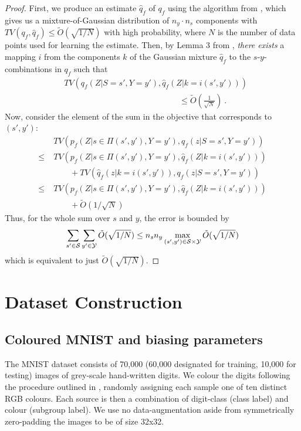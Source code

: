 \begin{proof}
First, we produce an estimate \(\hat{q}_f\) of \(q_f\) using the algorithm from
\cite{ashtiani2020near}, which gives us a mixture-of-Gaussian distribution of \(n_y\cdot n_s\)
components with \(TV(q_f, \hat{q}_f)\leq \tilde{O}(\sqrt{1/N})\) with high probability, where \(N\)
is the number of data points used for learning the estimate. Then, by Lemma 3 from
\cite{SohDunAngGuetal20}, \emph{there exists} a mapping \(i\) from the components \(k\) of the
Gaussian mixture \(\hat{q}_f\) to the \(s\)-\(y\)-combinations in \(q_f\) such that
%
\begin{align}
&TV(q_f(Z|S=s',Y=y'),\hat{q}_f(Z|k=i(s',y'))) \\
&\quad\quad\quad\quad\quad\quad\quad\quad\quad\quad\quad\quad\quad\quad\leq
\tilde{O}\left(\frac{1}{\sqrt{N}}\right)~. \nonumber
\end{align}
%
Now, consider the element of the sum in the objective that corresponds
to \((s',y')\):
%
\begin{align}
&TV(p_f(Z|s\in \Pi(s',y'),Y=y'), q_f(z|S=s',Y=y'))\nonumber\\
\leq \;&TV(p_f(Z|s\in \Pi(s',y'),Y=y'), \hat{q}_f(Z|k=i(s',y')))\nonumber\\
&\quad\quad+TV(\hat{q}_f(z|k=i(s',y')), q_f(z|S=s',Y=y'))\nonumber\\
\leq \;&TV(p_f(Z|s\in \Pi(s',y'),Y=y'), \hat{q}_f(Z|k=i(s',y'))) \nonumber\\
&\quad\quad+\tilde{O}(1/\sqrt{N})
\end{align}
%
Thus, for the whole sum over \(s\) and \(y\), the error is bounded by
\begin{align}
\sum\limits_{s'\in{\mathcal{S}}}\sum\limits_{y^\prime\in{\mathcal{Y}}}\tilde{O}(\sqrt{1/N})
\leq n_sn_y \max\limits_{(s',y')\in{\mathcal{S}}\times{\mathcal{Y}}}\tilde{O}(\sqrt{1/N})
\end{align}
which is equivalent to just \(\tilde{O}(\sqrt{1/N})\).
\end{proof}
%
\section{Dataset Construction}\label{sec:dataset-construction}
%
\subsection{Coloured MNIST and biasing parameters}
%
The MNIST dataset \cite{lecun1998gradient} consists of 70,000 (60,000 designated for training,
10,000 for testing) images of grey-scale hand-written digits. We colour the digits following the
procedure outlined in \cite{KehBarThoQua20}, randomly assigning each sample one of ten distinct RGB
colours. Each source is then a combination of digit-class (class label) and colour (subgroup label).
We use no data-augmentation aside from symmetrically zero-padding the images to be of size 32x32.

